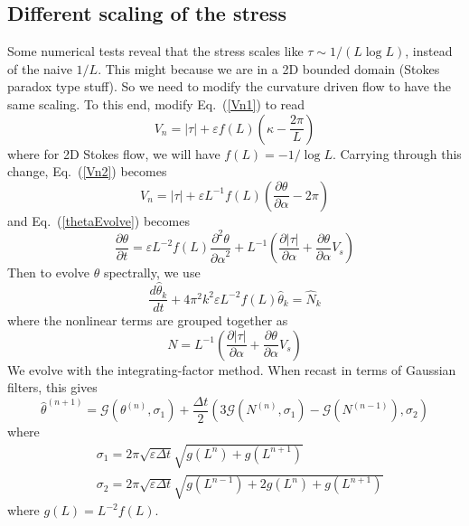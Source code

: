 \documentclass[11pt]{article}
\newcommand{\pd}[2]    { \frac{\partial #1} {\partial #2} }
\newcommand{\ppd}[2]  { \frac{\partial^2 #1}{{\partial #2}^2} }
\newcommand{\td}[2] { \frac{d #1} { d #2 } }
\newcommand{\abs}[1]{\left| #1 \right|}
\newcommand{\eps}{\varepsilon}
\newcommand{\atau}{\abs{\tau}}
\newcommand{\thh}{\hat{\theta}}
\newcommand{\GG}{\mathcal{G}}
\newcommand{\Dt}{\Delta t}
\begin{document}
\subsection{Different scaling of the stress}
Some numerical tests reveal that the stress scales like $\tau \sim 1/(L \log L)$, instead of the naive $1/L$. This might because we are in a 2D bounded domain (Stokes paradox type stuff). So we need to modify the curvature driven flow to have the same scaling. To this end, modify Eq.~(\ref{Vn1}) to read
\begin{equation}
V_n = \atau + \eps f(L) \left(\kappa - \frac{2 \pi}{L} \right)
\end{equation}
where for 2D Stokes flow, we will have $f(L) = -1/\log L$. Carrying through this change, Eq.~(\ref{Vn2}) becomes
\begin{equation}
V_n = \atau + \eps L^{-1} f(L) \left(\pd{\theta}{\alpha} - 2 \pi \right)
\end{equation}
and Eq.~(\ref{thetaEvolve}) becomes
\begin{equation}
\pd{\theta}{t} = \eps L^{-2} f(L) \ppd{\theta}{\alpha} + L^{-1} \left( \pd{\atau}{\alpha} + \pd{\theta}{\alpha} V_s \right)
\end{equation}
Then to evolve $\theta$ spectrally, we use
\begin{equation}
\td{\thh_k}{t} + 4 \pi^2 k^2 \eps L^{-2} f(L)  \thh_k = \hat{N}_k
\end{equation}
where the nonlinear terms are grouped together as
\begin{equation}
N = L^{-1} \left( \pd{\atau}{\alpha} + \pd{\theta}{\alpha} V_s \right)
\end{equation}
We evolve with the integrating-factor method. When recast in terms of Gaussian filters, this gives
\begin{equation}
\label{intfact}
\thh^{(n+1)} = \GG(\theta^{(n)}, \sigma_1) 
+ \frac{\Dt}{2} \left( 3 \GG(N^{(n)}, \sigma_1) - \GG(N^{(n-1)}), \sigma_2 \right)
\end{equation}
where
\begin{align}
& \sigma_1 = 2 \pi \sqrt{\eps \Dt} \sqrt{g(L^{n}) + g(L^{n+1}) } 	\\
& \sigma_2 = 2 \pi \sqrt{\eps \Dt} \sqrt{g(L^{n-1}) + 2 g(L^{n}) + g(L^{n+1}) }
\end{align}
where $g(L) = L^{-2} f(L)$.
\end{document}
